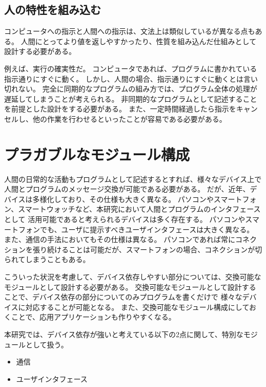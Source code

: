\subsection{人の特性を組み込む}\label{ux4ebaux306eux7279ux6027ux3092ux7d44ux307fux8fbcux3080}

コンピュータへの指示と人間への指示は、文法上は類似しているが異なる点もある。
人間にとってより値を返しやすかったり、性質を組み込んだ仕組みとして設計する必要がある。

例えば、実行の確実性だ。
コンピュータであれば、プログラムに書かれている指示通りにすぐに動く。
しかし、人間の場合、指示通りにすぐに動くとは言い切れない。
完全に同期的なプログラムの組み方では、プログラム全体の処理が遅延してしまうことが考えられる。
非同期的なプログラムとして記述することを前提とした設計をする必要がある。
また、一定時間経過したら指示をキャンセルし、他の作業を行わせるといったことが容易である必要がある。

\section{プラガブルなモジュール構成}\label{sec:plaggable-module-design}

人間の日常的な活動もプログラムとして記述するとすれば、様々なデバイス上で人間とプログラムのメッセージ交換が可能である必要がある。
だが、近年、デバイスは多様化しており、その仕様も大きく異なる。
パソコンやスマートフォン、スマートウォッチなど、本研究において人間とプログラムのインタフェースとして
活用可能であると考えられるデバイスは多く存在する。
パソコンやスマートフォンでも、ユーザに提示すべきユーザインタフェースは大きく異なる。
また、通信の手法においてもその仕様は異なる。
パソコンであれば常にコネクションを張り続けることは可能だが、スマートフォンの場合、コネクションが切られてしまうこともある。

こういった状況を考慮して、デバイス依存しやすい部分については、交換可能なモジュールとして設計する必要がある。
交換可能なモジュールとして設計することで、デバイス依存の部分についてのみプログラムを書くだけで
様々なデバイスに対応することが可能となる。
また、交換可能なモジュール構成にしておくことで、応用アプリケーションも作りやすくなる。

本研究では、デバイス依存が強いと考えている以下の2点に関して、特別なモジュールとして扱う。

\begin{itemize}
\itemsep1pt\parskip0pt
\item
  通信
\item
  ユーザインタフェース
\end{itemize}

